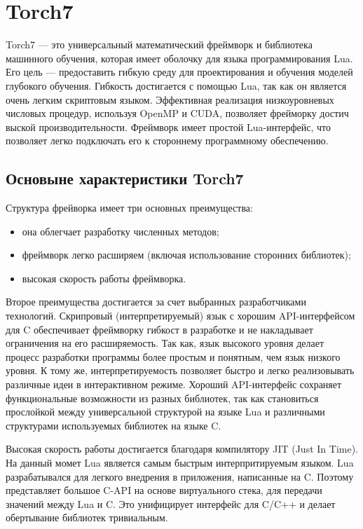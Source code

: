 \documentclass[a4paper,english,russian]{G2-105}
\begin{document}
\section{Torch7}
\par Torch7 --- это универсальный математический фреймворк и библиотека машинного обучения, которая имеет оболочку для языка программирования Lua. Его цель --- предоставить гибкую среду для проектирования и обучения моделей глубокого обучения. Гибкость достигается с помощью Lua, так как он является очень легким скриптовым языком. Эффективная реализация низкоуровневых числовых процедур, используя OpenMP и CUDA, позволяет фрейморку достич выской производительности. Фреймворк имеет простой Lua-интерфейс, что позволяет легко подключать его к стороннему программному обеспечению.
\ttl
\subsection{Основыне характеристики Torch7}
\par Структура фрейворка имеет три основных преимущества:
\begin{itemize}
\item она облегчает разработку численных методов;
\item фреймворк легко расширяем (включая использование сторонних библиотек);
\item высокая скорость работы фреймворка.
\end{itemize}
\par Второе преимущества достигается за счет выбранных разработчиками технологий. Скрипровый (интерпретируемый) язык с хорошим API-интерфейсом для C обеспечивает фреймворку гибкост в разработке и не накладывает ограничения на его расширяемость. Так как, язык высокого уровня делает процесс разработки программы более простым и понятным, чем язык низкого уровня. К тому же, интерпретируемость позволяет быстро и легко реализовывать различные идеи в интерактивном режиме. Хороший API-интерфейс сохраняет функциональные возможности из разных библиотек, так как становиться прослойкой между универсальной структурой на языке Lua и различными структурами используемых библиотек на языке C.
\par Высокая скорость работы достигается благодаря компилятору JIT (Just In Time). На данный момет Lua является самым быстрым интерпритируемым языком. Lua разрабатывался для легкого внедрения в приложения, написанные на C. Поэтому представляет большое C-API на основе виртуального стека, для передачи значений между Lua и C. Это унифицирует интерфейс для C/C++ и делает обертывание библиотек тривиальным.
\end{document}
